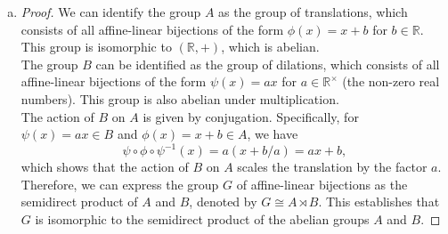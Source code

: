 \documentclass{article}
\def\rr{{\mathbb R}}
\begin{document}
\begin{enumerate}[(a)]
    \item \begin{proof}
        We can identify the group $A$ as the group of translations, which consists of all affine-linear bijections of the form $\phi(x) = x + b$ for $b \in \rr$. This group is isomorphic to $(\rr, +)$, which is abelian. \\
        The group $B$ can be identified as the group of dilations, which consists of all affine-linear bijections of the form $\psi(x) = a x$ for $a \in \rr^\times$ (the non-zero real numbers). This group is also abelian under multiplication. \\
        The action of $B$ on $A$ is given by conjugation. Specifically, for $\psi(x) = a x \in B$ and $\phi(x) = x + b \in A$, we have
        \[
            \psi \circ \phi \circ \psi^{-1}(x) = a (x + b/a) = a x + b,
        \]
        which shows that the action of $B$ on $A$ scales the translation by the factor $a$. \\
        Therefore, we can express the group $G$ of affine-linear bijections as the semidirect product of $A$ and $B$, denoted by $G \cong A \rtimes B$. This establishes that $G$ is isomorphic to the semidirect product of the abelian groups $A$ and $B$.
        \end{proof}
\end{enumerate}
\end{document}
